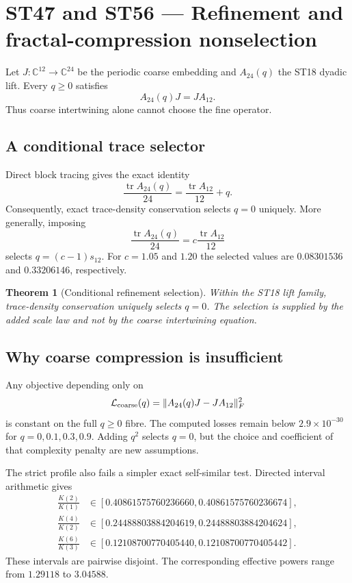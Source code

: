 \documentclass[11pt,a4paper]{article}
\newtheorem{theorem}{Theorem}[section]
\begin{document}
\section{ST47 and ST56 --- Refinement and fractal-compression nonselection}

Let $J:\mathbb C^{12}\rightarrow\mathbb C^{24}$ be the periodic coarse embedding and $A_{24}(q)$ the ST18 dyadic lift. Every $q\ge0$ satisfies
\[
A_{24}(q)J=JA_{12}.
\]
Thus coarse intertwining alone cannot choose the fine operator.

\subsection{A conditional trace selector}

Direct block tracing gives the exact identity
\begin{equation}
\frac{\operatorname{tr}A_{24}(q)}{24}
=\frac{\operatorname{tr}A_{12}}{12}+q.
\label{eq:trace-refinement}
\end{equation}
Consequently, exact trace-density conservation selects $q=0$ uniquely. More generally, imposing
\[
\frac{\operatorname{tr}A_{24}(q)}{24}=c\frac{\operatorname{tr}A_{12}}{12}
\]
selects $q=(c-1)s_{12}$. For $c=1.05$ and $1.20$ the selected values are $0.08301536$ and $0.33206146$, respectively.

\begin{theorem}[Conditional refinement selection]
Within the ST18 lift family, trace-density conservation uniquely selects $q=0$. The selection is supplied by the added scale law and not by the coarse intertwining equation.
\end{theorem}

\subsection{Why coarse compression is insufficient}

Any objective depending only on
\[
\mathcal L_{\rm coarse}(q)=\|A_{24}(q)J-JA_{12}\|_F^2
\]
is constant on the full $q\ge0$ fibre. The computed losses remain below $2.9\times10^{-30}$ for $q=0,0.1,0.3,0.9$. Adding $q^2$ selects $q=0$, but the choice and coefficient of that complexity penalty are new assumptions.

The strict profile also fails a simpler exact self-similar test. Directed interval arithmetic gives
\begin{align*}
\frac{K(2)}{K(1)}&\in[0.40861575760236660,0.40861575760236674],\\
\frac{K(4)}{K(2)}&\in[0.24488803884204619,0.24488803884204624],\\
\frac{K(6)}{K(3)}&\in[0.12108700770405440,0.12108700770405442].
\end{align*}
These intervals are pairwise disjoint. The corresponding effective powers range from $1.29118$ to $3.04588$.
\end{document}

